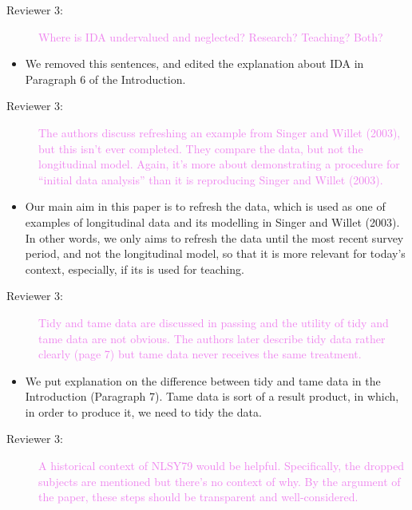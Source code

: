 \documentclass[12pt,a4paper,]{article}
\providecommand{\tightlist}{%
  \setlength{\itemsep}{0pt}\setlength{\parskip}{0pt}}
\begin{document}
\begin{description}
\item[Reviewer 3:]\textcolor{violet}{Where is IDA undervalued and neglected? Research? Teaching? Both?}
\end{description}

\begin{itemize}
\tightlist
\item
  We removed this sentences, and edited the explanation about IDA in Paragraph 6 of the Introduction.
\end{itemize}

\begin{description}
\item[Reviewer 3:]\textcolor{violet}{The authors discuss refreshing an example from Singer and Willet (2003), but this isn’t ever completed. They compare the data, but not the longitudinal model. Again, it’s more about demonstrating a procedure for “initial data analysis” than it is reproducing Singer and Willet (2003).}
\end{description}

\begin{itemize}
\tightlist
\item
  Our main aim in this paper is to refresh the data, which is used as one of examples of longitudinal data and its modelling in Singer and Willet (2003). In other words, we only aims to refresh the data until the most recent survey period, and not the longitudinal model, so that it is more relevant for today's context, especially, if its is used for teaching.
\end{itemize}

\begin{description}
\item[Reviewer 3:]\textcolor{violet}{Tidy and tame data are discussed in passing and the utility of tidy and tame data are not obvious. The authors later describe tidy data rather clearly (page 7) but tame data never receives the same treatment.}
\end{description}

\begin{itemize}
\tightlist
\item
  We put explanation on the difference between tidy and tame data in the Introduction (Paragraph 7). Tame data is sort of a result product, in which, in order to produce it, we need to tidy the data.
\end{itemize}

\begin{description}
\item[Reviewer 3:]\textcolor{violet}{A historical context of NLSY79 would be helpful. Specifically, the dropped subjects are mentioned but there’s no context of why. By the argument of the paper, these steps should be transparent and well-considered.}
\end{description}
\end{document}
